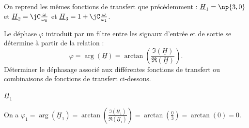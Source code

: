 
\finEntrainement






\hauteurLargeurCadreReponse		{7mm}{5cm}
\initialisationEntrainement

On reprend les mêmes fonctions de transfert que précédemment : 
$
 \underline{H}_1=\np{3,0}$ et   $ \underline{H}_2=\jC \frac{ \omega}{\omega_0} $ et $   \underline{H}_3=1+ \jC\frac{ \omega}{\omega_1}
$.


Le déphase $\varphi$ introduit par un filtre entre les signaux d'entrée et de sortie se détermine à partir de la relation : 
\[
\varphi= \arg\left(\underline{H}\right)=\arctan\left(\frac{\Im(\underline{H})}{\Re(\underline{H})}\right).
\]
Déterminer le déphasage associé aux différentes fonctions de transfert ou combinaisons de fonctions de transfert ci-dessous.

\debutEntrainement


\begin{enonce}
	$\underline{H}_1$
\end{enonce}


\begin{corrige}
On a $\varphi_1= \arg\left( \underline{H}_1 \right) =\arctan \left(  \frac{ \Im\left( \underline{H}_1\right) }{ \Re\left( \underline{H}_1\right) } \right) = \arctan \left(  \frac{ 0 }{ 3 } \right) = \arctan(0) = 0$.
\end{corrige}

